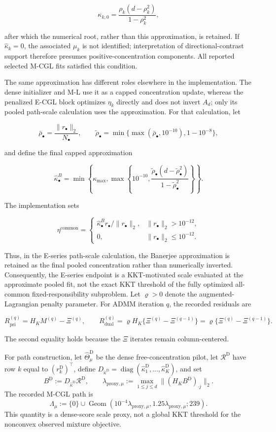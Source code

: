 \documentclass[preprint,12pt,authoryear]{elsarticle}
\begin{document}
\[
\kappa_{k,0}
=\frac{\rho_k(d-\rho_k^2)}{1-\rho_k^2},
\]

after which the numerical root, rather than this approximation, is retained.
If $\widehat\kappa_k=0$, the associated $\mu_k$ is not identified; interpretation
of directional-contrast support therefore presumes positive-concentration
components. All reported selected M-CGL fits satisfied this condition.

The same approximation has different roles elsewhere in the implementation.
The dense initializer and M-L use it as a capped concentration update, whereas
the penalized E-CGL block optimizes $\eta_k$ directly and does not invert
$A_d$; only its pooled path-scale calculation uses the approximation. For that
calculation, let

\[
\bar\rho_\bullet
=\frac{\lVert r_\bullet\rVert_2}{N_\bullet},
\qquad
\widetilde\rho_\bullet
=\min\{\max(\bar\rho_\bullet,10^{-10}),1-10^{-8}\},
\]

and define the final capped approximation

\[
\widehat\kappa_\bullet^B
=\min\left\{
\kappa_{\max},
\max\left\{
10^{-10},
\frac{\widetilde\rho_\bullet
(d-\widetilde\rho_\bullet^2)}
{1-\widetilde\rho_\bullet^2}
\right\}
\right\}.
\]

The implementation sets

\[
\eta^{\mathrm{common}}
=
\begin{cases}
\widehat\kappa_\bullet^B
r_\bullet/\lVert r_\bullet\rVert_2,
& \lVert r_\bullet\rVert_2>10^{-12},\\[3pt]
0, & \lVert r_\bullet\rVert_2\leq10^{-12}.
\end{cases}
\]

Thus, in the E-series path-scale calculation, the Banerjee approximation is
retained as the final pooled concentration rather than numerically inverted.
Consequently, the E-series endpoint is a KKT-motivated scale evaluated at the
approximate pooled fit, not the exact KKT threshold of the fully optimized
all-common fixed-responsibility subproblem.
Let $\varrho>0$ denote the augmented-Lagrangian penalty parameter. For ADMM
iteration $q$, the recorded residuals are

\[
R_{\mathrm{pri}}^{(q)}=H_KM^{(q)}-\Xi^{(q)},
\qquad
R_{\mathrm{dual}}^{(q)}
=\varrho H_K\{\Xi^{(q)}-\Xi^{(q-1)}\}
=\varrho\{\Xi^{(q)}-\Xi^{(q-1)}\}.
\]

The second equality holds because the $\Xi$ iterates remain column-centered.

For path construction, let $\widehat\Theta^{\mathrm D}_\mu$ be the dense
free-concentration pilot, let $\mathcal R^{\mathrm D}$ have row $k$ equal to
$(r_k^{\mathrm D})^\top$, define
$D_{\widehat\kappa^{\mathrm D}}
=\operatorname{diag}(\widehat\kappa_1^{\mathrm D},\ldots,
\widehat\kappa_K^{\mathrm D})$, and set
\[
B^{\mathrm D}
:=D_{\widehat\kappa^{\mathrm D}}\mathcal R^{\mathrm D},
\qquad
\lambda_{\mathrm{proxy},\mu}
:=\max_{1\le j\le d}
\lVert(H_KB^{\mathrm D})_{\cdot j}\rVert_2.
\]
The recorded M-CGL path is
\[
\Lambda_\mu
:=\{0\}\cup
\operatorname{Geom}
\left(
10^{-4}\lambda_{\mathrm{proxy},\mu},
1.25\lambda_{\mathrm{proxy},\mu};239
\right).
\]
This quantity is a dense-score scale proxy, not a global KKT threshold for the
nonconvex observed mixture objective.
\end{document}
